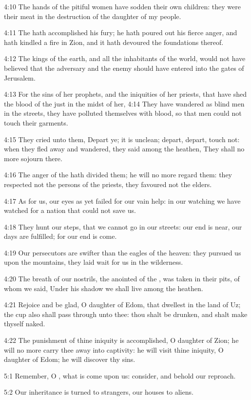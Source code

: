 4:10 The hands of the pitiful women have sodden their own children:
they were their meat in the destruction of the daughter of my people.

4:11 The \LORD hath accomplished his fury; he hath poured out his
fierce anger, and hath kindled a fire in Zion, and it hath devoured
the foundations thereof.

4:12 The kings of the earth, and all the inhabitants of the world,
would not have believed that the adversary and the enemy should have
entered into the gates of Jerusalem.

4:13 For the sins of her prophets, and the iniquities of her priests,
that have shed the blood of the just in the midst of her, 4:14 They
have wandered as blind men in the streets, they have polluted
themselves with blood, so that men could not touch their garments.

4:15 They cried unto them, Depart ye; it is unclean; depart, depart,
touch not: when they fled away and wandered, they said among the
heathen, They shall no more sojourn there.

4:16 The anger of the \LORD hath divided them; he will no more regard
them: they respected not the persons of the priests, they favoured not
the elders.

4:17 As for us, our eyes as yet failed for our vain help: in our
watching we have watched for a nation that could not save us.

4:18 They hunt our steps, that we cannot go in our streets: our end is
near, our days are fulfilled; for our end is come.

4:19 Our persecutors are swifter than the eagles of the heaven: they
pursued us upon the mountains, they laid wait for us in the
wilderness.

4:20 The breath of our nostrils, the anointed of the \LORD, was taken
in their pits, of whom we said, Under his shadow we shall live among
the heathen.

4:21 Rejoice and be glad, O daughter of Edom, that dwellest in the
land of Uz; the cup also shall pass through unto thee: thou shalt be
drunken, and shalt make thyself naked.

4:22 The punishment of thine iniquity is accomplished, O daughter of
Zion; he will no more carry thee away into captivity: he will visit
thine iniquity, O daughter of Edom; he will discover thy sins.

5:1 Remember, O \LORD, what is come upon us: consider, and behold our
reproach.

5:2 Our inheritance is turned to strangers, our houses to aliens.

